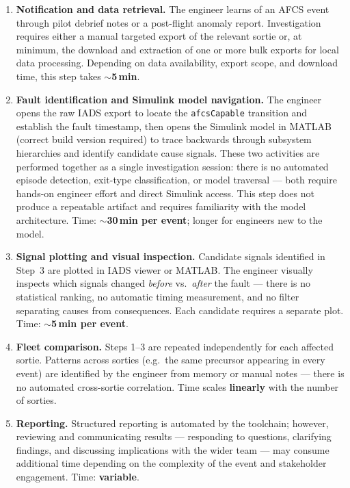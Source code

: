 \documentclass[11pt, letterpaper]{article}
\begin{document}
\begin{enumerate}[leftmargin=2em, itemsep=5pt, topsep=6pt]

  \item \textbf{Notification and data retrieval.}
    The engineer learns of an AFCS event through pilot debrief notes or a
    post-flight anomaly report. Investigation requires either a manual
    targeted export of the relevant sortie or, at minimum, the download and
    extraction of one or more bulk exports for local data processing.
    Depending on data availability, export scope, and download time, this
    step takes \textbf{$\sim$5\,min}.

  \item \textbf{Fault identification and Simulink model navigation.}
    The engineer opens the raw IADS export to locate the \texttt{afcsCapable}
    transition and establish the fault timestamp, then opens the Simulink model
    in MATLAB (correct build version required) to trace backwards through
    subsystem hierarchies and identify candidate cause signals. These two
    activities are performed together as a single investigation session: there
    is no automated episode detection, exit-type classification, or model
    traversal --- both require hands-on engineer effort and direct Simulink
    access. This step does not produce a repeatable artifact and requires
    familiarity with the model architecture.
    Time: \textbf{$\sim$30\,min per event}; longer for engineers new to the model.

  \item \textbf{Signal plotting and visual inspection.}
    Candidate signals identified in Step~3 are plotted in IADS viewer or
    MATLAB. The engineer visually inspects which signals changed \emph{before}
    vs.\ \emph{after} the fault --- there is no statistical ranking, no
    automatic timing measurement, and no filter separating causes from
    consequences. Each candidate requires a separate plot. Time:
    \textbf{$\sim$5\,min per event}.

  \item \textbf{Fleet comparison.}
    Steps 1--3 are repeated independently for each affected sortie. Patterns
    across sorties (e.g.\ the same precursor appearing in every event) are
    identified by the engineer from memory or manual notes --- there is no
    automated cross-sortie correlation. Time scales \textbf{linearly} with
    the number of sorties.

  \item \textbf{Reporting.}
    Structured reporting is automated by the toolchain; however, reviewing
    and communicating results --- responding to questions, clarifying findings,
    and discussing implications with the wider team --- may consume additional
    time depending on the complexity of the event and stakeholder engagement.
    Time: \textbf{variable}.

\end{enumerate}
\end{document}
